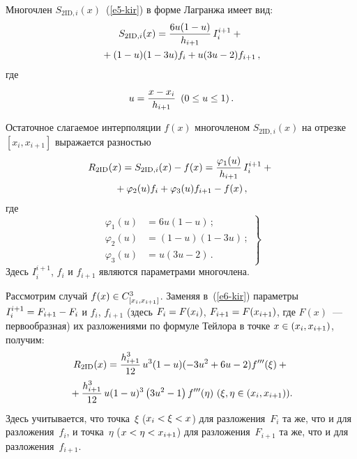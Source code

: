 \begin{multicols}{2}
  Многочлен $S_{2\mathrm{ID},i}(x)$~(\ref{e5-kir}) в форме Лагранжа имеет вид:
  \begin{multline*}
  S_{2\mathrm{ID},i}(x) =\displaystyle\frac{\displaystyle 6u(1-u)\mathstrut}{\displaystyle h_{i+1}\mathstrut}\,I_i^{i+1}+{}\\
  {}+(1-u) (1-3u)    f_i+ u(3u-2)f_{i+1}\,,
\end{multline*}
где 
$$
u=\displaystyle\frac{\displaystyle x-x_i\mathstrut}{\displaystyle h_{i+1}\mathstrut}\enskip (0\leq u\leq 1)\,.
$$
  
  Остаточное слагаемое интерполяции $f(x)$ многочленом $S_{2\mathrm{ID},i}(x)$ на 
отрезке $[x_i,x_{i+1}]$ выражается разностью
  \begin{multline}
  R_{2\mathrm{ID}}(x) =S_{2\mathrm{ID},i}(x)-f(x) 
=\displaystyle\frac{\displaystyle \varphi_1(u)\mathstrut}{\displaystyle h_{i+1}\mathstrut}\,I_i^{i+1}+{}\\
{}+\varphi_2(u)f_i +\varphi_3(u)f_{i+1}-f(x)\,,
  \label{e6-kir}
  \end{multline}
      где 
      \begin{equation}
      \left.
      \begin{array}{rl}
      \varphi_1(u) &= 6u(1-u)\,;\\[9pt]
      \varphi_2(u) &= (1-u)(1-3u)\,;\\[9pt]
      \varphi_3(u) &= u(3u-2)\,.
      \end{array}
      \right\}
      \label{e7-kir}
      \end{equation}
    Здесь $I_i^{i+1}$, $f_i$ и $f_{i+1}$ являются параметрами мно\-го\-члена.
  
  Рассмотрим случай $f(x)\hm\in C^3_{[x_i,x_{i+1}]}$. Заменяя в~(\ref{e6-kir}) 
параметры $I_i^{i+1}\hm= F_{i+1}\hm- F_i$ и $f_i$, $f_{i+1}$ (здесь $F_i\hm= 
F(x_{i})$, $F_{i+1}\hm= F(x_{i+1})$, где $F(x)$~--- первообразная) их разложениями 
по формуле Тейлора в точке $x\hm\in (x_i,x_{i+1})$, получим: 
  \begin{multline*}
  R_{2\mathrm{ID}}(x) =\displaystyle\frac{\displaystyle h^3_{i+1}\mathstrut}{\displaystyle 12\mathstrut}\,u^3(1-u)(-3u^2+6u-2)f^{\prime\prime\prime}
  (\xi)+{}\\
  {}+\displaystyle\frac{\displaystyle h^3_{i+1}\mathstrut}{\displaystyle 12\mathstrut}\, u(1-u)^3 \left(3u^2-1\right) f^{\prime\prime\prime}(\eta)\
(\xi,\eta\in (x_i,x_{i+1})).
  \end{multline*}
  Здесь учитывается, что точка~$\xi$ ($x_i\hm< \xi\hm < x$) для 
разложения~$F_i$ та же, что и для разложения~$f_i$, и точка~$\eta$ 
($x\hm<\eta \hm< x_{i+1}$) для разложения~$F_{i+1}$ та же, что и для 
разложения~$f_{i+1}$. 

\begin{table*}\small
\begin{center}
\parbox{380pt}{

}
\end{center}
\end{table*}
\end{multicols}
